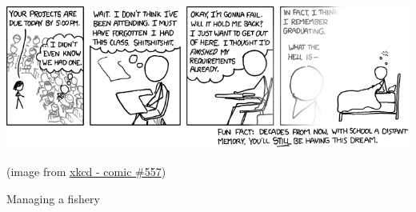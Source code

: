 %
%


\begin{topic}[Projects]


\vfil

\begin{center}
\begin{minipage}{450pt}
	\includegraphics*[width=450pt]{images/chap6-xkcd.png}

	\hfill {\footnotesize (image from \href{https://www.xkcd.com/557/}{xkcd - comic \#557})}
\end{minipage}
\end{center}
\end{topic}











%
%



\begin{project}{Managing a fishery}
	\label{proj:fishery}

	
\end{project}


%
%
%
%
%
%
%
%








